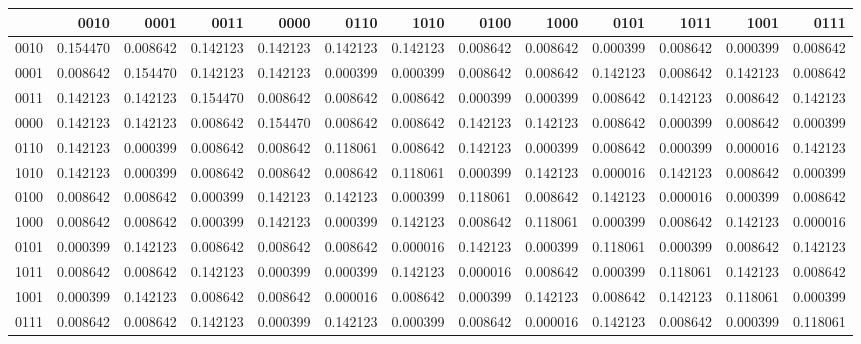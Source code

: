 \begin{tabular}{lrrrrrrrrrrrr}
\toprule
 & 0010 & 0001 & 0011 & 0000 & 0110 & 1010 & 0100 & 1000 & 0101 & 1011 & 1001 & 0111 \\
\midrule
0010 & 0.154470 & 0.008642 & 0.142123 & 0.142123 & 0.142123 & 0.142123 & 0.008642 & 0.008642 & 0.000399 & 0.008642 & 0.000399 & 0.008642 \\
0001 & 0.008642 & 0.154470 & 0.142123 & 0.142123 & 0.000399 & 0.000399 & 0.008642 & 0.008642 & 0.142123 & 0.008642 & 0.142123 & 0.008642 \\
0011 & 0.142123 & 0.142123 & 0.154470 & 0.008642 & 0.008642 & 0.008642 & 0.000399 & 0.000399 & 0.008642 & 0.142123 & 0.008642 & 0.142123 \\
0000 & 0.142123 & 0.142123 & 0.008642 & 0.154470 & 0.008642 & 0.008642 & 0.142123 & 0.142123 & 0.008642 & 0.000399 & 0.008642 & 0.000399 \\
0110 & 0.142123 & 0.000399 & 0.008642 & 0.008642 & 0.118061 & 0.008642 & 0.142123 & 0.000399 & 0.008642 & 0.000399 & 0.000016 & 0.142123 \\
1010 & 0.142123 & 0.000399 & 0.008642 & 0.008642 & 0.008642 & 0.118061 & 0.000399 & 0.142123 & 0.000016 & 0.142123 & 0.008642 & 0.000399 \\
0100 & 0.008642 & 0.008642 & 0.000399 & 0.142123 & 0.142123 & 0.000399 & 0.118061 & 0.008642 & 0.142123 & 0.000016 & 0.000399 & 0.008642 \\
1000 & 0.008642 & 0.008642 & 0.000399 & 0.142123 & 0.000399 & 0.142123 & 0.008642 & 0.118061 & 0.000399 & 0.008642 & 0.142123 & 0.000016 \\
0101 & 0.000399 & 0.142123 & 0.008642 & 0.008642 & 0.008642 & 0.000016 & 0.142123 & 0.000399 & 0.118061 & 0.000399 & 0.008642 & 0.142123 \\
1011 & 0.008642 & 0.008642 & 0.142123 & 0.000399 & 0.000399 & 0.142123 & 0.000016 & 0.008642 & 0.000399 & 0.118061 & 0.142123 & 0.008642 \\
1001 & 0.000399 & 0.142123 & 0.008642 & 0.008642 & 0.000016 & 0.008642 & 0.000399 & 0.142123 & 0.008642 & 0.142123 & 0.118061 & 0.000399 \\
0111 & 0.008642 & 0.008642 & 0.142123 & 0.000399 & 0.142123 & 0.000399 & 0.008642 & 0.000016 & 0.142123 & 0.008642 & 0.000399 & 0.118061 \\
\bottomrule
\end{tabular}
